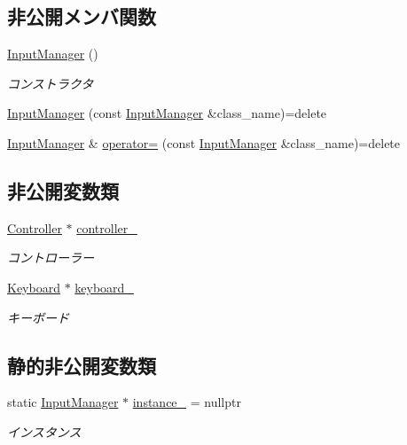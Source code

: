 \subsection*{非公開メンバ関数}
\begin{DoxyCompactItemize}
\item 
\mbox{\hyperlink{class_input_manager_a8be46886da639b26d67181c29dab6d6c}{Input\+Manager}} ()
\begin{DoxyCompactList}\small\item\em コンストラクタ \end{DoxyCompactList}\item 
\mbox{\hyperlink{class_input_manager_ae633f27688024e06b3d780778636c002}{Input\+Manager}} (const \mbox{\hyperlink{class_input_manager}{Input\+Manager}} \&class\+\_\+name)=delete
\item 
\mbox{\hyperlink{class_input_manager}{Input\+Manager}} \& \mbox{\hyperlink{class_input_manager_a4b1d021f5dcd4e029f5210b7dd99fa36}{operator=}} (const \mbox{\hyperlink{class_input_manager}{Input\+Manager}} \&class\+\_\+name)=delete
\end{DoxyCompactItemize}
\subsection*{非公開変数類}
\begin{DoxyCompactItemize}
\item 
\mbox{\hyperlink{class_controller}{Controller}} $\ast$ \mbox{\hyperlink{class_input_manager_ae0edcd4021e3dba96411944cb4d246d5}{controller\+\_\+}}
\begin{DoxyCompactList}\small\item\em コントローラー \end{DoxyCompactList}\item 
\mbox{\hyperlink{class_keyboard}{Keyboard}} $\ast$ \mbox{\hyperlink{class_input_manager_ae9f8c95ddea7d37cb564a7395bcfa65c}{keyboard\+\_\+}}
\begin{DoxyCompactList}\small\item\em キーボード \end{DoxyCompactList}\end{DoxyCompactItemize}
\subsection*{静的非公開変数類}
\begin{DoxyCompactItemize}
\item 
static \mbox{\hyperlink{class_input_manager}{Input\+Manager}} $\ast$ \mbox{\hyperlink{class_input_manager_af02cbb6e283b9aff50fa94f120f0e1db}{instance\+\_\+}} = nullptr
\begin{DoxyCompactList}\small\item\em インスタンス \end{DoxyCompactList}\end{DoxyCompactItemize}


